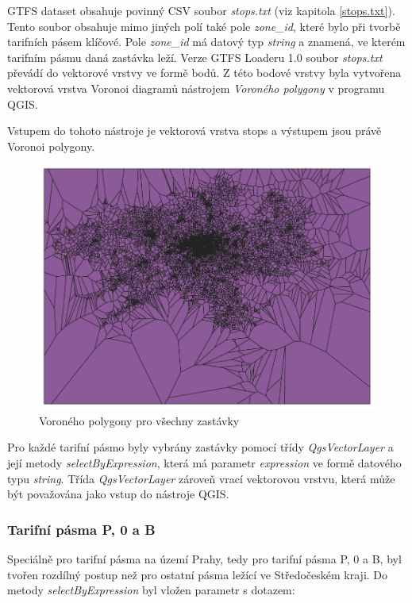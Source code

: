GTFS dataset obsahuje povinný CSV soubor \textit{stops.txt} (viz kapitola \ref{stops.txt}). Tento soubor obsahuje mimo
jiných polí také pole \textit{zone\_id}, které bylo při tvorbě tarifních pásem klíčové. 
Pole \textit{zone\_id} má datový typ \textit{string} a znamená, ve kterém tarifním
pásmu daná zastávka leží. Verze GTFS Loaderu 1.0 soubor \textit{stops.txt} převádí do vektorové vrstvy
ve formě bodů. Z této bodové vrstvy byla vytvořena vektorová vrstva Voronoi 
diagramů nástrojem \textit{Voroného polygony} v programu QGIS. 

Vstupem do tohoto nástroje je vektorová vrstva stops a výstupem jsou právě Voronoi polygony.

\begin{figure}[H] \centering
    \includegraphics[width=400pt]{./pictures/voronoi-stops.png}
    \caption[Voroného polygony pro všechny zastávky]{Voroného polygony pro všechny zastávky}
	\label{fig:voronoi-stops}              
\end{figure}
  
Pro každé tarifní pásmo byly vybrány zastávky pomocí třídy \textit{QgsVectorLayer}
a její metody \textit{selectByExpression}, která má parametr \textit{expression} ve formě datového
typu \textit{string}. 
Třída \textit{QgsVectorLayer} zároveň vrací vektorovou vrstvu, která může být považována jako vstup do nástroje QGIS.

\subsubsection{Tarifní pásma P, 0 a B}

Speciálně pro tarifní pásma na území Prahy, tedy pro tarifní pásma P, 0 a B, byl tvořen rozdílný postup
než pro ostatní pásma ležící ve Středočeském kraji. Do metody \textit{selectByExpression} byl vložen
parametr s dotazem: 

